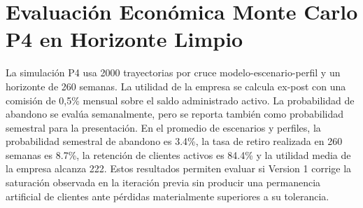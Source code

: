 \documentclass[11pt]{article}
\begin{document}
\section{Evaluación Económica Monte Carlo P4 en Horizonte Limpio}
La simulación P4 usa 2000 trayectorias por cruce modelo-escenario-perfil y un horizonte de 260 semanas. La utilidad de la empresa se calcula ex-post con una comisión de 0,5\% mensual sobre el saldo administrado activo. La probabilidad de abandono se evalúa semanalmente, pero se reporta también como probabilidad semestral para la presentación.
En el promedio de escenarios y perfiles, la probabilidad semestral de abandono es 3.4\%, la tasa de retiro realizada en 260 semanas es 8.7\%, la retención de clientes activos es 84.4\% y la utilidad media de la empresa alcanza 222. Estos resultados permiten evaluar si Version 1 corrige la saturación observada en la iteración previa sin producir una permanencia artificial de clientes ante pérdidas materialmente superiores a su tolerancia.
\begin{table}[H]
\centering
{}
\caption{Resultados P4 y comportamiento de clientes para Version 1.}
\label{tab:version_1:p4}
\end{table}
\end{document}
